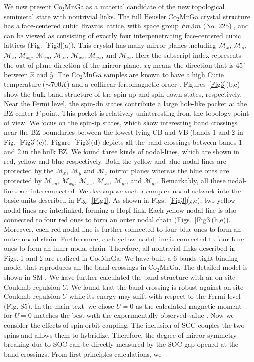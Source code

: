\documentclass[aps,prl,superscriptaddress,twocolumn,showpacs]{revtex4-1}
\begin{document}
We now present Co$_2$MnGa as a material candidate of the new topological semimetal state with nontrivial links. The full Heusler Co$_2$MnGa crystal structure has a face-centered cubic Bravais lattice, with space group $Fm\bar{3}m$ (No. $225$) \cite{Heusler_crystal}, and can be viewed as consisting of exactly four interpenetrating  face-centered cubic lattices (Fig.~\ref{Fig3}(a)). This crystal has many mirror planes including $\mathcal{M}_x$, $\mathcal{M}_y$, $\mathcal{M}_z$, $\mathcal{M}_{xy}$, $\mathcal{M}_{x\bar{y}}$, $\mathcal{M}_{xz}$, $\mathcal{M}_{x\bar{z}}$, $\mathcal{M}_{yz}$, and $\mathcal{M}_{y\bar{z}}$. Here the subscript index represents the out-of-plane direction of the mirror plane. $xy$ means the direction that is $45^{\circ}$ between $\hat{x}$ and $\hat{y}$. The Co$_2$MnGa samples are known to have a high Curie temperature ($\sim700 K$) and a collinear ferromagnetic order \cite{Heusler_Curie}. Figures~\ref{Fig3}(b,c) show the bulk band structure of the spin-up and spin-down states, respectively. Near the Fermi level, the spin-dn states contribute a large hole-like pocket at the BZ center $\Gamma$ point. This pocket is relatively uninteresting from the topology point of view. We focus on the spin-ip states, which show interesting band crossings near the BZ boundaries between the lowest lying CB and VB (bands 1 and 2 in Fig.~\ref{Fig3}(c)). Figure~\ref{Fig3}(d) depicts all the band crossings between bands 1 and 2 in the bulk BZ. We found three kinds of nodal-lines, which are shown in red, yellow and blue respectively. Both the yellow and blue nodal-lines are protected by the $\mathcal{M}_x$, $\mathcal{M}_y$ and $\mathcal{M}_z$ mirror planes whereas the blue ones are protected by $\mathcal{M}_{xy}$, $\mathcal{M}_{x\bar{y}}$, $\mathcal{M}_{xz}$, $\mathcal{M}_{x\bar{z}}$, $\mathcal{M}_{yz}$, and $\mathcal{M}_{y\bar{z}}$. Remarkably, all these nodal-lines are interconnected. We decompose such a complex nodal network into the basic units described in Fig.~\ref{Fig1}. As shown in Figs.~\ref{Fig3}(g,e), two yellow nodal-lines are interlinked, forming a Hopf link. Each yellow nodal-line is also connected to four red ones to form an outer nodal chain (Figs.~\ref{Fig3}(h,e)). Moreover, each red nodal-line is further connected to four blue ones to form an outer nodal chain. Furthermore, each yellow nodal-line is connected to four blue ones to form an inner nodal chain. Therefore, all nontrivial links described in Figs. 1 and 2 are realized in Co$_2$MnGa. We have built a 6-bands tight-binding model that reproduces all the band crossings in Co$_2$MnGa. The detailed model is shown in SM \cite{SM}. We have further calculated the band structure with an on-site Coulomb repulsion $U$. We found that the band crossing is robust against on-site Coulomb repulsion $U$ while its energy may shift with respect to the Fermi level (Fig. S5). In the main text, we chose $U=0$ as the calculated magnetic moment for $U=0$ matches the best with the experimentally observed value \cite{Heusler_Curie}. Now we consider the effects of spin-orbit coupling. The inclusion of SOC couples the two spins and allows them to hybridize. Therefore, the degree of mirror symmetry breaking due to SOC can be directly measured by the SOC gap opened at the band crossings. From first principles calculations, we 
\end{document}
